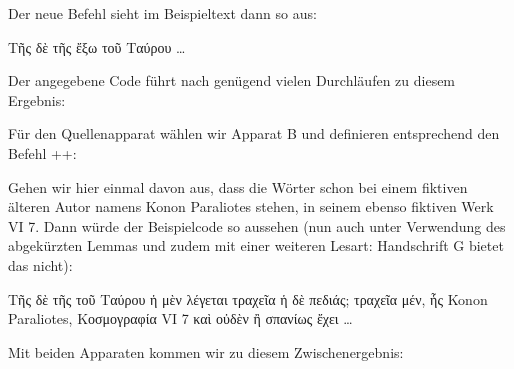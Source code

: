 \begin{lfgwcode}{}
\newcommand\vari[3][]{%
  \edtext{#2}{\if$#1$#2\else\lemma{#1}\fi
    \Cfootnote{#3}}}
\end{lfgwcode}

Der neue Befehl sieht im Beispieltext dann so aus:

\begin{lfgwcode}{}
Τῆς  δὲ τῆς ἔξω τοῦ Ταύρου \dots{}
\end{lfgwcode}

Der angegebene Code führt nach genügend vielen Durchläufen zu diesem Ergebnis:

\begin{reledmacbsp}{\bsplineenum}
\end{reledmacbsp}

Für den Quellenapparat wählen wir Apparat B und definieren entsprechend den Befehl ++:

\begin{lfgwcode}{}
\newcommand\quell[3][]{%
  \edtext{#2}{\if$#1$#2\else\lemma{#1}\fi
    \Bfootnote{#3}}}
\end{lfgwcode}

Gehen wir hier einmal davon aus, dass die Wörter  schon bei einem fiktiven 
älteren Autor namens Konon Paraliotes stehen, in seinem ebenso fiktiven Werk  VI 7. Dann würde der Beispielcode so aussehen (nun auch unter Verwendung des abgekürzten 
Lemmas und zudem mit einer weiteren Lesart: Handschrift G bietet das  nicht):

\begin{lfgwcode}{}
Τῆς  δὲ τῆς  
τοῦ Ταύρου ἡ μὲν λέγεται τραχεῖα ἡ δὲ πεδιάς;
τραχεῖα μέν, ἧς %
{Konon Paraliotes, Κοσμογραφία VI 7} καὶ οὐδὲν ἢ σπανίως ἔχει \dots{}
\end{lfgwcode}

Mit beiden Apparaten kommen wir zu diesem Zwischenergebnis:

\begin{reledmacbsp}{\bsplineenum}
\end{reledmacbsp}


